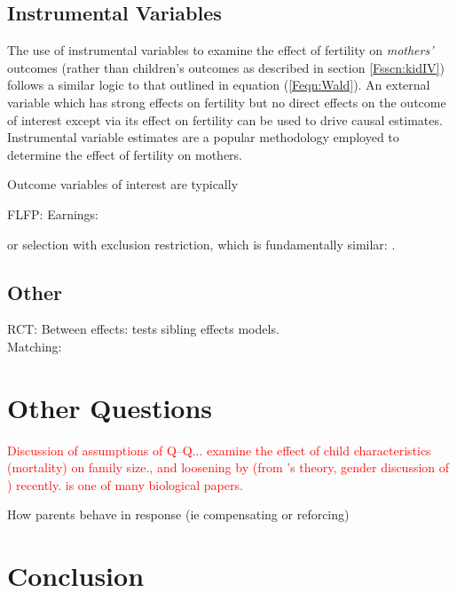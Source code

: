 \subsection{Instrumental Variables}
The use of instrumental variables to examine the effect of fertility on 
\emph{mothers'} outcomes (rather than children's outcomes as described
in section \ref{Fsscn:kidIV}) follows a similar logic to that outlined in
equation (\ref{Feqn:Wald}).  An external variable which has strong effects
on fertility but no direct effects on the outcome of interest except via its
effect on fertility can be used to drive causal estimates.  Instrumental 
variable estimates are a popular methodology employed to determine the 
effect of fertility on mothers.

Outcome variables of interest are typically 

FLFP: \citet{AgueroMarks2008,AgueroMarks2011,ChunOh2002,Caceres2008}
Earnings:

\citet{Ananatetal2009,Miller2011,
BronarsGrogger1994,KimAassve2006,RosenzweigSchultz1987,
Caceres2006,Hotzetal1997}
or selection with exclusion restriction, which is fundamentally similar: 
\citet{Ribar1994}.

\subsection{Other}
RCT: \citet{DiCensoetal2002}
Between effects: \citet{Holmlund2005,GeronimusKorenman1992} \citet{Ribar1999} 
tests sibling effects models.\\
Matching: \citet{ChevalierViitanen2003,LevinePainter2003}

\newpage



\section{Other Questions}
\textcolor{red}{Discussion of assumptions of Q--Q...
 examine the effect of child 
characteristics (mortality) on family size., and loosening by 
\citet{AizerCunha2012} (from \citet{Behrmanetal1982}'s theory, gender discussion 
of \citet{ButcherCase1994}) recently. \citet{Lawsonetal2012} is one of many 
biological papers.}

How parents behave in response (ie compensating or reforcing)

\section{Conclusion}






